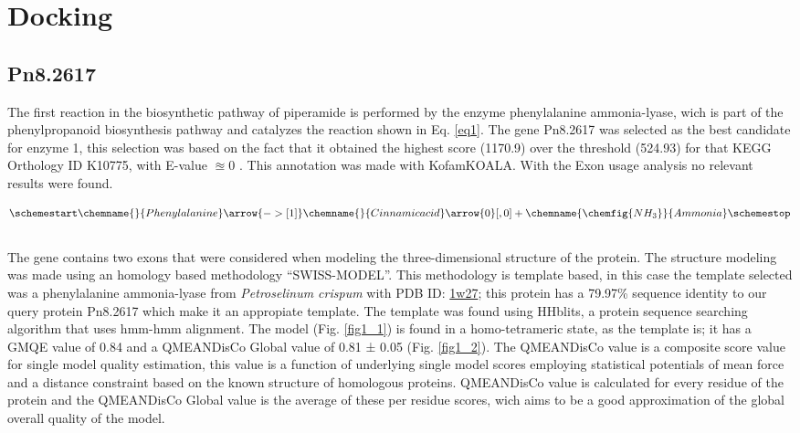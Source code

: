 \documentclass[12pt]{article}
\begin{document}
	\section{Docking}
	
	\subsection{Pn8.2617}
	
	The first reaction in the biosynthetic pathway of piperamide is performed by the enzyme phenylalanine ammonia-lyase, wich is part of the phenylpropanoid biosynthesis pathway and catalyzes the reaction shown in Eq. \ref{eq1}. The gene Pn8.2617 was selected as the best candidate for enzyme 1, this selection was based on the fact that it obtained the highest score (1170.9) over the threshold (524.93) for that KEGG Orthology ID K10775, with E-value $\approxeq 0$ . This annotation was made with KofamKOALA. \cite{kofamkoala} With the Exon usage analysis no relevant results were found.
	
	\begin{align}
		\schemestart
		 \label{eq1}
		\chemname{\footnotesize}{Phenylalanine}\arrow{->[\footnotesize 1]}\chemname{\footnotesize}{Cinnamic acid}
		\arrow{0}[,0]+
		\chemname{\chemfig{NH_3}}{Ammonia}
		\schemestop
	\end{align}\\
	
	The gene contains two exons that were considered when modeling the three-dimensional structure of the protein. The structure modeling was made using an homology based methodology ``SWISS-MODEL''. \cite{swiss,quaternary_swiss} This methodology is template based, in this case the template selected was a phenylalanine ammonia-lyase from \textit{Petroselinum crispum} with PDB ID: \href{https://www.rcsb.org/structure/1w27}{1w27}; this protein has a 79.97\% sequence identity to our query protein Pn8.2617 which make it an appropiate template. The template was found using HHblits, a protein sequence searching algorithm that uses hmm-hmm alignment. \cite{hhblits} The model (Fig. \ref{fig1_1}) is found in a homo-tetrameric state, as the template is; it has a GMQE value of 0.84 and a QMEANDisCo Global value of 0.81 ± 0.05 (Fig. \ref{fig1_2}). The QMEANDisCo value is a composite score value for single model quality estimation, this value is a function of underlying single model scores employing statistical potentials of mean force and a distance constraint based on the known structure of homologous proteins. QMEANDisCo value is calculated for every residue of the protein and the QMEANDisCo Global value is the average of these per residue scores, wich aims to be a good approximation of the global overall quality of the model. \cite{qmeandisco_swiss}
\end{document}
